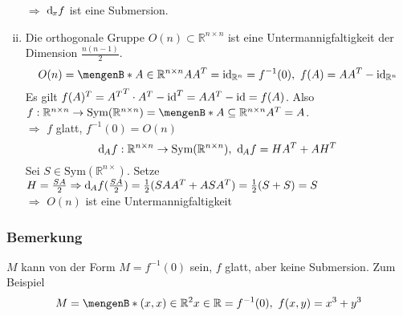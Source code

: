 \begin{enumerate}[(i)]
\[	\]
	$\Rightarrow$ $\mathrm{d}\mkern-1.0mu_x f$ ist eine Submersion.
	\item Die orthogonale Gruppe $O(n) \subset \mathds{R}^{n \times n}$ ist eine Untermannigfaltigkeit der Dimension $\frac{n(n-1)}{2}$.
	\[
		O(n) = \set[A \in \mathds{R}^{n \times n}]{AA^T = \id_{\mathds{R}^n} = f^{-1}(0)},\ f(A) = AA^T - \id_{\mathds{R}^n}
	\]
	Es gilt $f(A)^T = {A^T}^T \cdot A^T - \operatorname{id}^T = AA^T - \operatorname{id} = f(A)$. Also $f:\mathds{R}^{n \times n} \to \text{Sym}(\mathds{R}^{n \times n}) = \set[A \subseteq \mathds{R}^{n \times n}]{A^T = A}$.\\
	$\Rightarrow$ $f$ glatt, $f^{-1}(0) = O(n)$
	\[
		\mathrm{d}\mkern-1.0mu_A f:\mathbb{R}^{n \times n} \to \text{Sym}(\mathbb{R}^{n \times n}),\ \mathrm{d}\mkern-1.0mu_A f = HA^T+AH^T
	\]
	Sei $S \in \text{Sym}(\mathds{R}^{n \times})$. Setze $H = \frac{SA}{2} \Rightarrow \mathrm{d}\mkern-1.0mu_A f(\frac{SA}{2}) = \frac{1}{2}(SAA^T+ASA^T) = \frac{1}{2}(S +  S) = S$\\
	$\Rightarrow$ $O(n)$ ist eine Untermannigfaltigkeit
\end{enumerate}

\subsubsection[Bemerkung: ]{Bemerkung} %
\label{ssub:18}
$M$ kann von der Form $M = f^{-1}(0)$ sein, $f$ glatt, aber keine Submersion. Zum Beispiel
	\[
		M = \set[(x,x)\in \mathds{R}^2]{x \in \mathds{R}} = f^{-1}(0),\ f(x,y) = x^3 +y^3	
	\]
	
